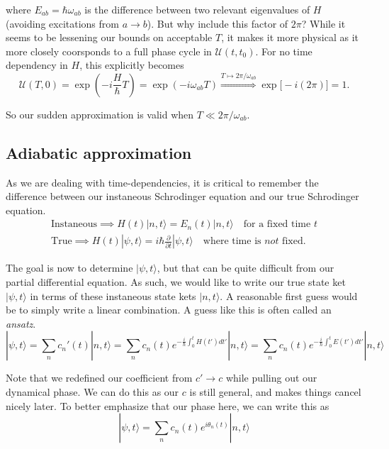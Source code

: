 \documentclass[12pt]{revtex4-2}
\begin{document}
where $E_{ab} = \hbar\omega_{ab}$ is the difference between two relevant eigenvalues of $H$ (avoiding excitations from $a \to b$).  But why include this factor of $2\pi$?  While it seems to be lessening our bounds on acceptable $T$, it makes it more physical as it more closely coorsponds to a full phase cycle in $\mathcal{U}(t,t_0)$.  For no time dependency in $H$, this explicitly becomes
\begin{equation}
    \mathcal{U}(T,0) = \exp\left(-i\frac{H}{\hbar}T\right) = \exp\left(-i\omega_{ab}T\right) \overset{T\mapsto 2\pi/\omega_{ab}}{\Longrightarrow} \exp\big[-i(2\pi)\big] = 1.
\end{equation}

So our sudden approximation is valid when $T \ll 2\pi/\omega_{ab}$.

\subsection{Adiabatic approximation}
As we are dealing with time-dependencies, it is critical to remember the difference between our instaneous Schrodinger equation and our true Schrodinger equation.
\begin{gather}
    \text{Instaneous} \implies H(t)|n,t\rangle = E_n(t)|n,t\rangle \quad \text{for a fixed time $t$} \\
    \text{True} \implies H(t)|\psi,t\rangle = i\hbar\frac{\partial}{\partial t}|\psi,t\rangle \quad \text{where time is } \textit{not} \text{ fixed}.
\end{gather}

The goal is now to determine $|\psi,t\rangle$, but that can be quite difficult from our partial differential equation.  As such, we would like to write our true state ket $|\psi,t\rangle$ in terms of these instaneous state kets $|n,t\rangle$.  A reasonable first guess would be to simply write a linear combination.  A guess like this is often called an \emph{ansatz}.
\begin{equation}
    |\psi,t\rangle = \sum_n c_n'(t)|n,t\rangle = \sum_n c_n(t)e^{-\frac{i}{\hbar}\int_0^t H(t')dt'}|n,t\rangle = \sum_n c_n(t)e^{-\frac{i}{\hbar}\int_0^t E(t')dt'}|n,t\rangle
\end{equation}

Note that we redefined our coefficient from $c' \to c$ while pulling out our dynamical phase.  We can do this as our $c$ is still general, and makes things cancel nicely later.  To better emphasize that our phase here, we can write this as
\begin{equation}
    |\psi,t\rangle = \sum_n c_n(t)e^{i\theta_n(t)}|n,t\rangle
\end{equation}
\end{document}
